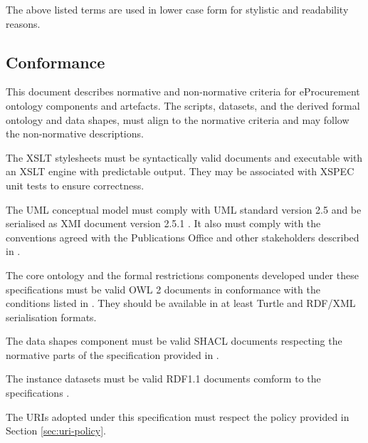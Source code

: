 	The above listed terms are used in lower case form for stylistic and readability reasons. 
	
	\subsection{Conformance}
	
	This document describes normative and non-normative criteria for eProcurement ontology components and artefacts. The scripts, datasets, and the derived formal ontology and data shapes, must align to the normative criteria and may follow the non-normative descriptions. 
	
	The XSLT stylesheets \citep{xslt3-Kay} must be syntactically valid documents and executable with an XSLT engine with predictable output. They may be associated with XSPEC unit tests \cite{xspec-cirulli2017xspec} to ensure correctness.
	
	The UML conceptual model must comply with UML standard version 2.5 \citep{uml2.5} and be serialised as XMI document version 2.5.1 \cite{xmi2.5.1}. It also must comply with the conventions agreed with the Publications Office and other stakeholders described in \citet{costetchi2020b}.
	
	The core ontology and the formal restrictions components developed under these specifications must be valid OWL 2 documents in conformance with the conditions listed in \citet{owl2-comformance}. They should be available in at least Turtle and \mbox{RDF/XML} serialisation formats.
	
	The data shapes component must be valid SHACL documents respecting the normative parts of the specification provided in \cite{shacl-spec}.
	
	The instance datasets must be valid RDF1.1 documents comform to the specifications \cite{rdfs11-spec}.
	
	The URIs adopted under this specification must respect the policy provided in Section \ref{sec:uri-policy}.
	
	